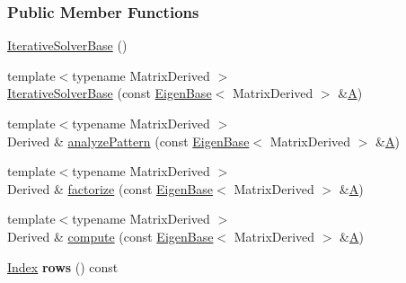 \subsubsection*{Public Member Functions}
\begin{DoxyCompactItemize}
\item 
\hyperlink{group___iterative_linear_solvers___module_a0922f2be45082690d7734aa6732fc493}{Iterative\+Solver\+Base} ()
\item 
{\footnotesize template$<$typename Matrix\+Derived $>$ }\\\hyperlink{group___iterative_linear_solvers___module_a3c68fe3cd929ea1ff8a0d4cbcd65ebad}{Iterative\+Solver\+Base} (const \hyperlink{group___core___module_struct_eigen_1_1_eigen_base}{Eigen\+Base}$<$ Matrix\+Derived $>$ \&\hyperlink{group___core___module_class_eigen_1_1_matrix}{A})
\item 
{\footnotesize template$<$typename Matrix\+Derived $>$ }\\Derived \& \hyperlink{group___iterative_linear_solvers___module_a3f684fb41019ca04d97ddc08a0d8be2e}{analyze\+Pattern} (const \hyperlink{group___core___module_struct_eigen_1_1_eigen_base}{Eigen\+Base}$<$ Matrix\+Derived $>$ \&\hyperlink{group___core___module_class_eigen_1_1_matrix}{A})
\item 
{\footnotesize template$<$typename Matrix\+Derived $>$ }\\Derived \& \hyperlink{group___iterative_linear_solvers___module_a1374b141721629983cd8276b4b87fc58}{factorize} (const \hyperlink{group___core___module_struct_eigen_1_1_eigen_base}{Eigen\+Base}$<$ Matrix\+Derived $>$ \&\hyperlink{group___core___module_class_eigen_1_1_matrix}{A})
\item 
{\footnotesize template$<$typename Matrix\+Derived $>$ }\\Derived \& \hyperlink{group___iterative_linear_solvers___module_a7dfa55c55e82d697bde227696a630914}{compute} (const \hyperlink{group___core___module_struct_eigen_1_1_eigen_base}{Eigen\+Base}$<$ Matrix\+Derived $>$ \&\hyperlink{group___core___module_class_eigen_1_1_matrix}{A})
\item 
\mbox{\label{group___iterative_linear_solvers___module_a51213f927ba8c833807544bf5e58c8b9}} 
\hyperlink{namespace_eigen_a62e77e0933482dafde8fe197d9a2cfde}{Index} {\bfseries rows} () const
\item 
\mbox{\label{group___iterative_linear_solvers___module_a0f6ceadc947fcbe32a3c68060e2ce6be}} 

\end{DoxyCompactItemize}
